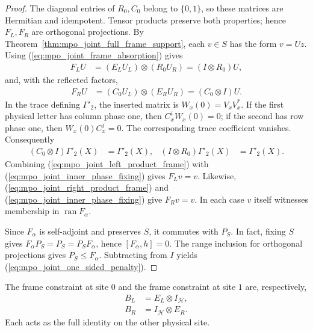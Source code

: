 \begin{proof}
    The diagonal entries of $R_0,C_0$ belong to $\{0,1\}$, so these
    matrices are Hermitian and idempotent. Tensor products preserve
    both properties; hence $F_L,F_R$ are orthogonal projections.
    By Theorem~\ref{thm:mpo_joint_full_frame_support}, each $v\in S$
    has the form $v=Uz$. Using
    (\ref{eq:mpo_joint_frame_absorption}) gives
    \begin{align}
        F_LU & =(E_LU_L)\otimes(R_0U_R)=(I\otimes R_0)U,
        \label{eq:mpo_joint_left_product_frame}
    \end{align}
    and, with the reflected factors,
    \begin{align}
        F_RU & =(C_0U_L)\otimes(E_RU_R)=(C_0\otimes I)U.
        \label{eq:mpo_joint_right_product_frame}
    \end{align}
    In the trace defining $\Gamma'_2$, the inserted matrix is
    $W_x(0)=V_xV_x^*$. If the first physical letter has column phase
    one, then $C_x^iW_x(0)=0$; if the second has row phase one, then
    $W_x(0)C_x^j=0$. The corresponding trace coefficient vanishes.
    Consequently
    \begin{align}
        (C_0\otimes I)\Gamma'_2(X) & =\Gamma'_2(X), &
        (I\otimes R_0)\Gamma'_2(X) & =\Gamma'_2(X).
        \label{eq:mpo_joint_inner_phase_fixing}
    \end{align}
    Combining (\ref{eq:mpo_joint_left_product_frame}) with
    (\ref{eq:mpo_joint_inner_phase_fixing}) gives $F_Lv=v$.
    Likewise, (\ref{eq:mpo_joint_right_product_frame}) and
    (\ref{eq:mpo_joint_inner_phase_fixing}) give $F_Rv=v$.
    In each case $v$ itself witnesses membership in
    $\operatorname{ran}F_\alpha$.

    Since $F_\alpha$ is self-adjoint and preserves $S$, it commutes
    with $P_S$. In fact, fixing $S$ gives
    $F_\alpha P_S=P_S=P_SF_\alpha$, hence $[F_\alpha,h]=0$.
    The range inclusion for orthogonal projections gives
    $P_S\le F_\alpha$. Subtracting from $I$ yields
    (\ref{eq:mpo_joint_one_sided_penalty}).
\end{proof}

\begin{definition}
    \label{def:mpo_joint_boundary_site_projections}
    The frame constraint at site $0$ and the frame constraint at
    site $1$ are, respectively,
    \begin{align}
        B_L & =E_L\otimes I_{\mathcal H}, \\
        B_R & =I_{\mathcal H}\otimes E_R.
    \end{align}
    Each acts as the full identity on the other physical site.
\end{definition}

